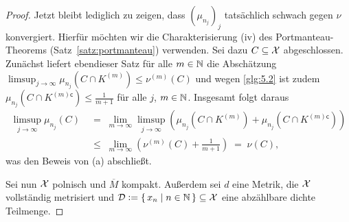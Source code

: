 \documentclass[../thesis/thesis.tex]{subfiles}
\begin{document}
\begin{proof}
		Jetzt bleibt lediglich zu zeigen, dass $(\mu_{n_j})_j$ tatsächlich schwach gegen $\nu$ konvergiert. 
		Hierfür möchten wir die Charakterisierung (iv) des Portmanteau-Theorems (Satz~\ref{satz:portmanteau}) verwenden.
		Sei dazu $C \subseteq \mathcal{X}$ abgeschlossen. Zunächst liefert ebendieser Satz für alle $m \in \mathbb{N}$ die 
		Abschätzung $\limsup_{j \to \infty} \mu_{n_j}(C \cap K^{(m)}) \leq \nu^{(m)}(C)$ und wegen \eqref{glg:5.2} ist 
		zudem $\mu_{n_j}(C \cap K^{(m) \mathsf{c}}) \leq  \frac{1}{m+1}$ für alle $j$, $m \in \mathbb{N}$. Insgesamt folgt daraus 
		\begin{align*}
			\limsup_{j \to \infty} \mu_{n_j}(C) \; &=    \; \lim_{m \to \infty} \limsup_{j \to \infty} 
			\left( \mu_{n_j}(C \cap K^{(m)}) + \mu_{n_j}(C \cap K^{(m) \mathsf{c}}) \right) \\
			&\leq \; \lim_{m \to \infty} \left( \nu^{(m)}(C) + \frac{1}{m+1} \right) 
			\; = \; \nu(C) \text{,}
		\end{align*}
		was den Beweis von (a) abschließt.
		
		Sei nun $\mathcal{X}$ polnisch und $\overline{M}$ kompakt. Außerdem sei $d$ eine Metrik, die $\mathcal{X}$ vollständig metrisiert 
		und $\mathcal{D} \vcentcolon = \left\{\, x_n \; \middle| \; n \in \mathbb{N} \,\right\} \subseteq \mathcal{X}$ eine abzählbare dichte Teilmenge.
		

\end{proof}
\end{document}
